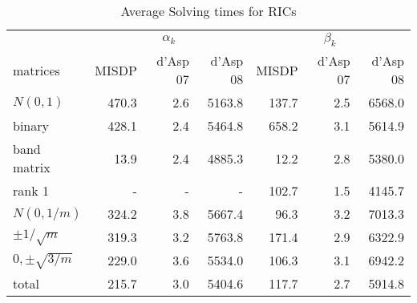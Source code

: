 \begin{table} 
 \begin{scriptsize} \caption{Average Solving times for RICs} 
 \label{rhsTime} 
 \begin{tabular*}{\linewidth}{@{}l@{\;\;\extracolsep{\fill}}rrrrrr@{}}\toprule 
  & \multicolumn{3}{c}{$\alpha_k$} & \multicolumn{3}{c}{$\beta_k$} \\ 
\cmidrule(r){2-4} \cmidrule(l){5-7} 
 matrices & MISDP & d'Asp 07 & d'Asp 08 & MISDP & d'Asp 07 & d'Asp 08 \\ \midrule 
$N(0,1)$& \num{470.3} & \num{2.6} & \num{5163.8} & \num{137.7} & \num{2.5} & \num{6568.0} \\ 
 binary& \num{428.1} & \num{2.4} & \num{5464.8} & \num{658.2} & \num{3.1} & \num{5614.9} \\ 
 band matrix& \num{13.9} & \num{2.4} & \num{4885.3} & \num{12.2} & \num{2.8} & \num{5380.0} \\ 
 rank 1& - & - & - & \num{102.7} & \num{1.5} & \num{4145.7} \\ 
 $N(0,1/m)$& \num{324.2} & \num{3.8} & \num{5667.4} & \num{96.3} & \num{3.2} & \num{7013.3} \\ 
 $\pm 1/\sqrt{m}$& \num{319.3} & \num{3.2} & \num{5763.8} & \num{171.4} & \num{2.9} & \num{6322.9} \\ 
 $0, \pm \sqrt{3/m}$& \num{229.0} & \num{3.6} & \num{5534.0} & \num{106.3} & \num{3.1} & \num{6942.2} \\ 
 \midrule 
total & \num{215.7} & \num{3.0} & \num{5404.6} & \num{117.7} & \num{2.7} & \num{5914.8} \\ 
 \bottomrule 
 \end{tabular*} 
 \end{scriptsize} 
 \end{table} 
